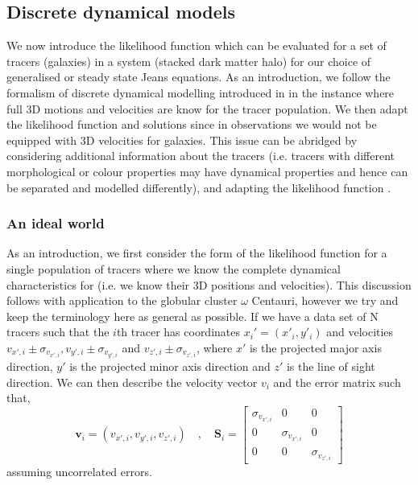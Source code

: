 \subsection{Discrete dynamical models} \label{sec:discrete_dynamical_models}
We now introduce the likelihood function which can be evaluated for a set of tracers (galaxies) in a system (stacked dark matter halo) for our choice of generalised or steady state Jeans equations. As an introduction, we follow the formalism of discrete dynamical modelling introduced in \citet{watkins2013} in the instance where full 3D motions and velocities are know for the tracer population. We then adapt the likelihood function and solutions since in observations we would not be equipped with 3D velocities for galaxies. This issue can be abridged by considering additional information about the tracers (i.e. tracers with different morphological or colour properties may have dynamical properties and hence can be separated and modelled differently), and adapting the likelihood function \citep[e.g.][]{zhu16sculptor}.


\subsubsection{An ideal world}
As an introduction, we first consider the form of the likelihood function for a single population of tracers where we know the complete dynamical characteristics for (i.e. we know their 3D positions and velocities). This discussion follows \cite{watkins13} with application to the globular cluster $\omega$ Centauri, however we try and keep the terminology here as general as possible. If we have a data set of N tracers such that the $i$th tracer has coordinates $x_{i}'= (x'_{i},y'_{i})$ and velocities $v_{x',i} \pm \sigma_{v_{x',i}}, v_{y',i} \pm \sigma_{v_{y',i}}$ and $v_{z',i} \pm \sigma_{v_{z',i}}$, where $x'$ is the projected major axis direction, $y'$ is the projected minor axis direction and $z'$ is the line of sight direction. We can then describe the velocity vector \textbf{$v_{i}$} and the error matrix  such that,
\begin{equation}
\boldsymbol{v}_{i} = (v_{x',i},v_{y',i},v_{z',i}) \quad , \quad \boldsymbol{S}_{i} = \begin{bmatrix} \sigma_{v_{x',i}} & 0 & 0 \\ 0 & \sigma_{v_{x',i}} & 0 \\ 0 & 0 & \sigma_{v_{z',i}} \end{bmatrix}
\end{equation}
assuming uncorrelated errors.

